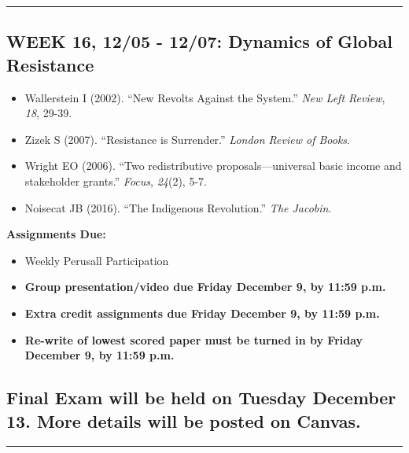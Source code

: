 \documentclass[11pt,]{article}
\providecommand{\tightlist}{%
  \setlength{\itemsep}{0pt}\setlength{\parskip}{0pt}}
\begin{document}
\bigbreak
\hrule

\hypertarget{week-16-1205---1207-dynamics-of-global-resistance}{%
\subsection{WEEK 16, 12/05 - 12/07: Dynamics of Global
Resistance}\label{week-16-1205---1207-dynamics-of-global-resistance}}

\begin{itemize}
\item
  Wallerstein I (2002). ``New Revolts Against the System.'' \emph{New
  Left Review}, \emph{18}, 29-39.
\item
  Zizek S (2007). ``Resistance is Surrender.'' \emph{London Review of
  Books}.
\item
  Wright EO (2006). ``Two redistributive proposals---universal basic
  income and stakeholder grants.'' \emph{Focus}, \emph{24}(2), 5-7.
\item
  Noisecat JB (2016). ``The Indigenous Revolution.'' \emph{The Jacobin}.
\end{itemize}

\textbf{Assignments Due:}

\begin{itemize}
\tightlist
\item
  Weekly Perusall Participation
\item
  \textbf{Group presentation/video due Friday December 9, by 11:59 p.m.}
\item
  \textbf{Extra credit assignments due Friday December 9, by 11:59 p.m.}
\item
  \textbf{Re-write of lowest scored paper must be turned in by Friday
  December 9, by 11:59 p.m.}
\end{itemize}

\hypertarget{final-exam-will-be-held-on-tuesday-december-13.-more-details-will-be-posted-on-canvas.}{%
\subsection{Final Exam will be held on Tuesday December 13. More details
will be posted on
Canvas.}\label{final-exam-will-be-held-on-tuesday-december-13.-more-details-will-be-posted-on-canvas.}}

\bigbreak
\hrule
\end{document}
